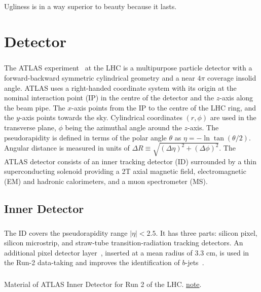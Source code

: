 \begin{savequote}[75mm]
Ugliness is in a way superior to beauty because it lasts.
\end{savequote}
\chapter{Detector}
\paragraph{}
The ATLAS experiment~\cite{PERF-2007-01} at the LHC is a multipurpose particle detector with a forward-backward symmetric cylindrical geometry and a near $4\pi$ coverage insolid angle. 
ATLAS uses a right-handed coordinate system with its origin at the nominal interaction point (IP) in the centre of the detector and the $z$-axis along the beam pipe.
The $x$-axis points from the IP to the centre of the LHC ring, and the $y$-axis points towards the sky.
Cylindrical coordinates $(r,\phi)$ are used in the transverse plane, $\phi$ being the azimuthal angle around the $z$-axis.
The pseudorapidity is defined in terms of the polar angle $\theta$ as $\eta = -\ln \tan(\theta/2)$.
Angular distance is measured in units of $\Delta R \equiv \sqrt{(\Delta\eta)^{2} + (\Delta\phi)^{2}}$.
The ATLAS detector consists of an inner tracking detector (ID) surrounded by a thin superconducting solenoid providing a 2T axial magnetic field, electromagnetic (EM) and hadronic calorimeters, and a muon spectrometer (MS).
\section{Inner Detector}
\paragraph{}
The ID covers the pseudorapidity range $|\eta| < 2.5$.
It has three parts: silicon pixel, silicon microstrip, and straw-tube transition-radiation tracking detectors.
An additional pixel detector layer~\cite{Capeans:1291633}, inserted at a mean radius of 3.3 cm,
is used in the Run-2 data-taking and improves the identification of $b$-jets~\cite{ATL-PHYS-PUB-2015-022}.
\paragraph{}
Material of ATLAS Inner Detector for Run 2 of the LHC. \href{https://cds.cern.ch/record/2260595/files/PERF-2015-07-002.pdf}{note}.

